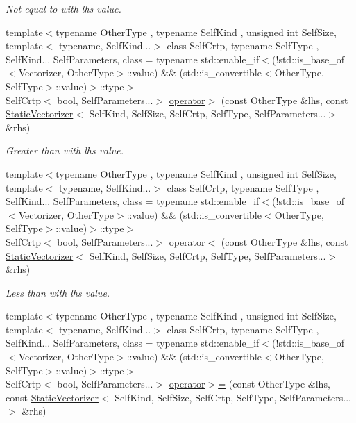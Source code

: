\begin{DoxyCompactItemize}
\begin{DoxyCompactList}\small\item\em Not equal to with lhs value. \end{DoxyCompactList}\item 
{\footnotesize template$<$typename Other\-Type , typename Self\-Kind , unsigned int Self\-Size, template$<$ typename, Self\-Kind...$>$ class Self\-Crtp, typename Self\-Type , Self\-Kind... Self\-Parameters, class  = typename std\-::enable\-\_\-if$<$(!std\-::is\-\_\-base\-\_\-of$<$\-Vectorizer, Other\-Type$>$\-::value) \&\& (std\-::is\-\_\-convertible$<$\-Other\-Type, Self\-Type$>$\-::value)$>$\-::type$>$ }\\Self\-Crtp$<$ bool, Self\-Parameters...$>$ \hyperlink{namespacemagrathea_a359833aecc50754be7c7b221283a2138}{operator$>$} (const Other\-Type \&lhs, const \hyperlink{classmagrathea_1_1StaticVectorizer}{Static\-Vectorizer}$<$ Self\-Kind, Self\-Size, Self\-Crtp, Self\-Type, Self\-Parameters...$>$ \&rhs)
\begin{DoxyCompactList}\small\item\em Greater than with lhs value. \end{DoxyCompactList}\item 
{\footnotesize template$<$typename Other\-Type , typename Self\-Kind , unsigned int Self\-Size, template$<$ typename, Self\-Kind...$>$ class Self\-Crtp, typename Self\-Type , Self\-Kind... Self\-Parameters, class  = typename std\-::enable\-\_\-if$<$(!std\-::is\-\_\-base\-\_\-of$<$\-Vectorizer, Other\-Type$>$\-::value) \&\& (std\-::is\-\_\-convertible$<$\-Other\-Type, Self\-Type$>$\-::value)$>$\-::type$>$ }\\Self\-Crtp$<$ bool, Self\-Parameters...$>$ \hyperlink{namespacemagrathea_aedb6a548d2625b43ca0a0eda0a1fc6dd}{operator$<$} (const Other\-Type \&lhs, const \hyperlink{classmagrathea_1_1StaticVectorizer}{Static\-Vectorizer}$<$ Self\-Kind, Self\-Size, Self\-Crtp, Self\-Type, Self\-Parameters...$>$ \&rhs)
\begin{DoxyCompactList}\small\item\em Less than with lhs value. \end{DoxyCompactList}\item 
{\footnotesize template$<$typename Other\-Type , typename Self\-Kind , unsigned int Self\-Size, template$<$ typename, Self\-Kind...$>$ class Self\-Crtp, typename Self\-Type , Self\-Kind... Self\-Parameters, class  = typename std\-::enable\-\_\-if$<$(!std\-::is\-\_\-base\-\_\-of$<$\-Vectorizer, Other\-Type$>$\-::value) \&\& (std\-::is\-\_\-convertible$<$\-Other\-Type, Self\-Type$>$\-::value)$>$\-::type$>$ }\\Self\-Crtp$<$ bool, Self\-Parameters...$>$ \hyperlink{namespacemagrathea_afc88a73a3d47bd5bce68ae97e4c12607}{operator$>$=} (const Other\-Type \&lhs, const \hyperlink{classmagrathea_1_1StaticVectorizer}{Static\-Vectorizer}$<$ Self\-Kind, Self\-Size, Self\-Crtp, Self\-Type, Self\-Parameters...$>$ \&rhs)

\end{DoxyCompactItemize}
